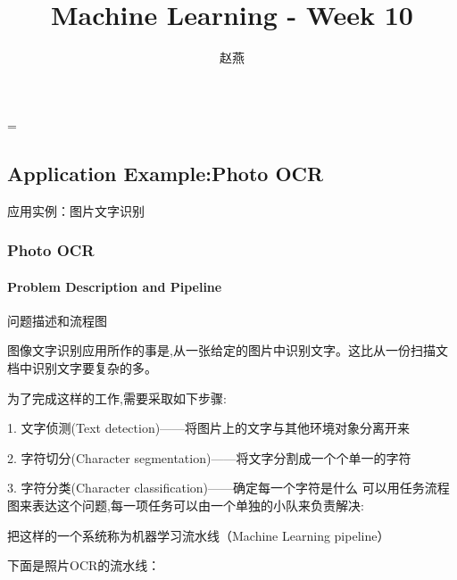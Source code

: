 \documentclass{article}
\title{Machine Learning - Week 10}
\author{赵燕}
\date{}
\begin{document}
 
\hfuzz=\maxdimen
{}
\begin{CJK}{UTF8}{gbsn} 
\maketitle
\renewcommand\contentsname{目录}
\renewcommand\figurename{图}
\tableofcontents
\newpage

\part{Application Example:Photo OCR}
\subparagraph{}
应用实例：图片文字识别
\section{Photo OCR}
\subsection{Problem Description and Pipeline}
\subparagraph{}
问题描述和流程图
\begin{figure}[H]
\label{fig:2202}
\end{figure}
\subparagraph{}
图像文字识别应用所作的事是,从一张给定的图片中识别文字。这比从一份扫描文档中识别文字要复杂的多。
\subparagraph{}
为了完成这样的工作,需要采取如下步骤:
\subparagraph{}
1. 文字侦测(Text detection)——将图片上的文字与其他环境对象分离开来
\subparagraph{}
2. 字符切分(Character segmentation)——将文字分割成一个个单一的字符
\subparagraph{}
3. 字符分类(Character classification)——确定每一个字符是什么 可以用任务流程图来表达这个问题,每一项任务可以由一个单独的小队来负责解决:
\begin{figure}[H]
\label{fig:2205}
\end{figure}
\subparagraph{}
把这样的一个系统称为机器学习流水线（Machine Learning pipeline）
\subparagraph{}
下面是照片OCR的流水线：
\begin{figure}[H]
\label{fig:2201}
\end{figure}
\begin{figure}[H]
\label{fig:2206}
\end{figure}

\end{CJK}
\end{document}
